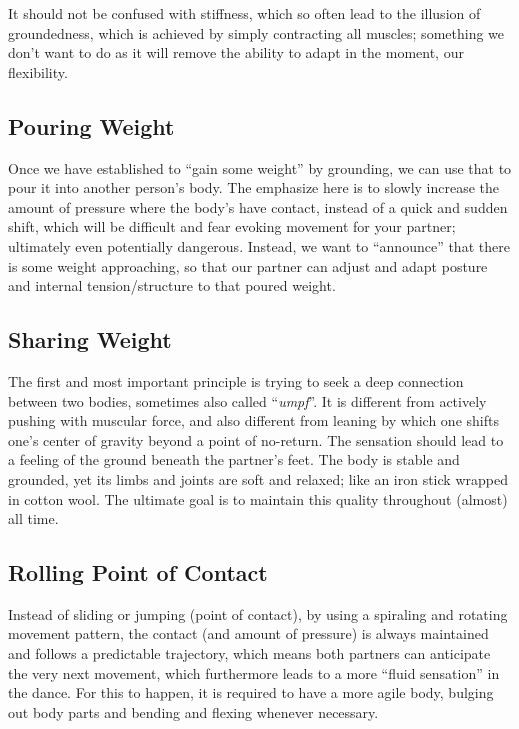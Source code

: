 It should not be confused with stiffness, which so often lead to the illusion of groundedness, which is achieved by simply contracting all muscles; something we don't want to do as it will remove the ability to adapt in the moment, our flexibility.

\subsection{Pouring Weight}\label{subsec:pouring-weight}

Once we have established to ``gain some weight'' by grounding, we can use that to pour it into another person's body.
The emphasize here is to slowly increase the amount of pressure where the body's have contact, instead of a quick and sudden shift, which will be difficult and fear evoking movement for your partner; ultimately even potentially dangerous.
Instead, we want to ``announce'' that there is some weight approaching, so that our partner can adjust and adapt posture and internal tension/structure to that poured weight.

\subsection{Sharing Weight}\label{subsec:sharing-weight}

The first and most important principle is trying to seek a deep connection between two bodies, sometimes also called ``\textit{umpf}''.
It is different from actively pushing with muscular force, and also different from leaning by which one shifts one's center of gravity beyond a point of no-return.
The sensation should lead to a feeling of the ground beneath the partner's feet.
The body is stable and grounded, yet its limbs and joints are soft and relaxed; like an iron stick wrapped in cotton wool.
The ultimate goal is to maintain this quality throughout (almost) all time.

\subsection{Rolling Point of Contact}\label{subsec:rolling-point-of-contact}

Instead of sliding or jumping (point of contact), by using a spiraling and rotating movement pattern, the contact (and amount of pressure) is always maintained and follows a predictable trajectory, which means both partners can anticipate the very next movement, which furthermore leads to a more ``fluid sensation'' in the dance.
For this to happen, it is required to have a more agile body, bulging out body parts and bending and flexing whenever necessary.

